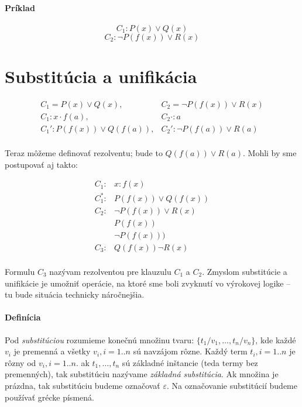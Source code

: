 \paragraph{Príklad}
$$C_1: P(x) \lor Q(x)$$
$$C_2: \neg P(f(x)) \lor R(x)$$



\section{Substitúcia a unifikácia}

$$
\begin{array}{ll}
C_1  = P(x) \lor Q(x),& C_2 = \neg P(f(x)) \lor R(x)\\
C_1:  x \cdot f(a),&  C_2 \cdot : a\\
C_1':  P(f(x)) \lor Q(f(a)),& C_2':\neg P(f(a)) \lor R(a)\\
\end{array}
$$

Teraz môžeme definovať rezolventu; bude to $Q(f(a)) \lor R(a)$. Mohli by sme
postupovať aj takto:

$$
\begin{array}{ll}
C_1: & x: f(x) \\
C_1^*: & P(f(x)) \lor Q(f(x)) \\
C_2: & \neg P(f(x)) \lor R(x)\\
 & P(f(x))\\
 & \neg P(f(x)))\\
C_3: & Q(f(x)) \neg R(x)\\
\end{array}
$$

Formulu $C_3$ nazývam rezolventou pre klauzulu $C_1$ a $C_2$. Zmyslom
substitúcie a unifikácie je umožniť operácie, na ktoré sme boli zvyknutí vo
výrokovej logike -- tu bude situácia technicky náročnejšia.

\paragraph{Definícia} Pod \emph{substitúciou} rozumieme konečnú množinu tvaru:
$\{t_1/v_1, \ldots, t_n/v_n\}$, kde každé $v_i$ je premenná a všetky $v_i,
i=1..n$ sú navzájom rôzne. Každý term $t_i, i=1..n$ je rôzny od $v_i, i=1..n$.
ak $t_1, \ldots, t_n$ sú základné inštancie (teda termy bez premenných), tak
substitúciu nazývame \emph{základná substitúcia}. Ak množina je prázdna, tak
substitúciu budeme označovať $\varepsilon$. Na označovanie substitúcií budeme
používať grécke písmená.

